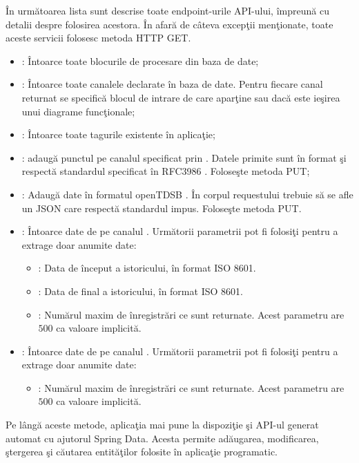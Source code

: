 În următoarea lista sunt descrise toate endpoint-urile API-ului, împreună cu detalii despre folosirea acestora. În afară de câteva excepţii menţionate, toate aceste servicii folosesc metoda HTTP GET.
\begin{itemize}
	\item {}: Întoarce toate blocurile de procesare din baza de date; 
	\item {}: Întoarce toate canalele declarate în baza de date. Pentru fiecare canal returnat se specifică blocul de intrare de care aparţine sau dacă este ieşirea unui diagrame funcţionale;
	\item {}: Întoarce toate tagurile existente în aplicaţie;
	\item {}: adaugă punctul  pe canalul specificat prin . Datele primite sunt în format  şi respectă standardul specificat în RFC3986 \autocite{rfc3986}. Foloseşte metoda PUT;
	\item {}: Adaugă date în formatul openTDSB \autocite{openTSDB}. În corpul requestului trebuie să se afle un JSON care respectă standardul impus. Foloseşte metoda PUT.
	\item {}: Întoarce date de pe canalul . Următorii parametrii pot fi folosiţi pentru a extrage doar anumite date:
	\begin{itemize}
		\item {}: Data de început a istoricului, în format ISO 8601.
		\item {}: Data de final a istoricului, în format ISO 8601.
		\item {}: Numărul maxim de înregistrări ce sunt returnate. Acest parametru are $500$ ca valoare implicită.
	\end{itemize}
	\item {}: Întoarce date de pe canalul . Următorii parametrii pot fi folosiţi pentru a extrage doar anumite date:
	\begin{itemize}
		\item {}: Numărul maxim de înregistrări ce sunt returnate. Acest parametru are $500$ ca valoare implicită.
	\end{itemize}
\end{itemize}
Pe lângă aceste metode, aplicaţia mai pune la dispoziţie şi API-ul generat automat cu ajutorul Spring Data. Acesta permite adăugarea, modificarea, ştergerea şi căutarea entităţilor folosite în aplicaţie programatic.

